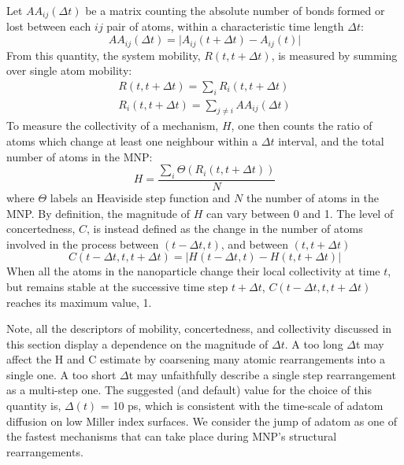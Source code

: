 Let $AA_{ij}(\Delta t)$ be
a matrix counting the absolute number of bonds formed or lost between each $ij$ pair of atoms, within a characteristic time length $\Delta t$:
\begin{equation}
    AA_{ij} \left( \Delta t \right) = \vert A_{ij} \left( t + \Delta t \right) - A_{ij}(t) \vert
\end{equation}
From this quantity, the system mobility, $R(t, t + \Delta t)$, is measured by summing over single atom mobility:
\begin{eqnarray}
 \nonumber   R(t, t +\Delta t) =\sum_i R_i(t, t +\Delta t)
\\
R_i(t, t + \Delta t) = \sum_{j\ne i} AA_{ij} (\Delta t)
\end{eqnarray}
%
To measure the collectivity of a mechanism, $H$, one then counts the ratio of atoms which change at least one neighbour within a  $\Delta t$  interval, and the total number of atoms in the MNP:
\begin{equation}
    H = \frac{ \sum_i \Theta (R_i(t, t +\Delta t)) }{N}
\end{equation}
where $\Theta$ labels an Heaviside step function and $N$ the number of atoms in the MNP.
%
By definition, the magnitude of $H$ can vary between 0 and 1.
%
The level of concertedness, $C$, is instead defined as the change in the number of atoms involved in the process between $(t - \Delta t, t)$, and between $(t, t + \Delta t)$
\begin{equation}
    C(t - \Delta t, t, t + \Delta t) = \vert H(t - \Delta t, t) - H(t, t + \Delta t) \vert
\end{equation}
%
When all the atoms in the nanoparticle change their local collectivity at time $t$, but remains stable at the successive time step $t +\Delta t$, $C(t - \Delta t, t, t +\Delta t)$ reaches its maximum value,  1.
%

Note, all the descriptors of mobility, concertedness, and collectivity discussed in this section display a dependence on the magnitude of $\Delta t$.
A too long $\Delta$t may affect the H and C estimate by coarsening many atomic rearrangements into a single one. 
A too short $\Delta$t may unfaithfully describe a single step rearrangement as a multi-step one.
%
The suggested (and default) value for the choice of this quantity is, $\Delta (t)$ = 10 ps, which is consistent with the time-scale of adatom diffusion on low Miller index surfaces. 
We consider the jump of adatom as one of the fastest  mechanisms that can take place during MNP's structural rearrangements.

